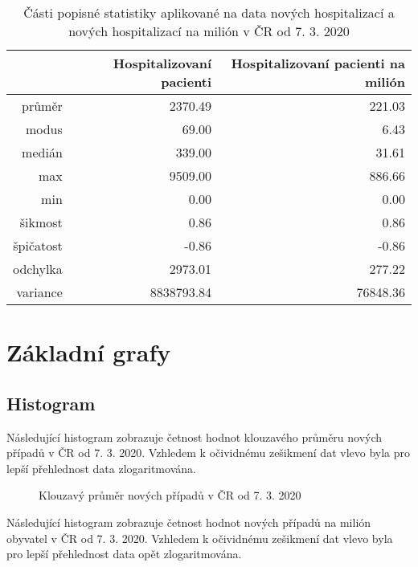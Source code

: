 \documentclass[a4paper, 12pt]{article}
\begin{document}
\begin{table}[ht]
\centering
\begin{tabular}{rrr}
  \hline
 & Hospitalizovaní pacienti & Hospitalizovaní pacienti na milión \\ 
  \hline
průměr & 2370.49 & 221.03 \\ 
  modus & 69.00 & 6.43 \\ 
  medián & 339.00 & 31.61 \\ 
  max & 9509.00 & 886.66 \\ 
  min & 0.00 & 0.00 \\ 
  šikmost & 0.86 & 0.86 \\ 
  špičatost & -0.86 & -0.86 \\ 
  odchylka & 2973.01 & 277.22 \\ 
  variance & 8838793.84 & 76848.36 \\ 
   \hline
\end{tabular}
\caption{Části popisné statistiky aplikované na data nových hospitalizací a nových hospitalizací na milión v ČR od 7. 3. 2020} 
\label{table:popisStat}
\end{table}


\section{Základní grafy}
\subsection{Histogram}

Následující histogram zobrazuje četnost hodnot klouzavého průměru nových případů v ČR od 7. 3. 2020.
Vzhledem k očividnému zešikmení dat vlevo byla pro lepší přehlednost data zlogaritmována.


\begin{figure}[H]
\centering
{}
\qquad
{}
\caption{Klouzavý průměr nových případů v ČR od 7. 3. 2020}
\end{figure}

\clearpage

Následující histogram zobrazuje četnost hodnot nových případů na milión obyvatel v ČR od 7. 3. 2020.
Vzhledem k očividnému zešikmení dat vlevo byla pro lepší přehlednost data opět zlogaritmována.
\end{document}
